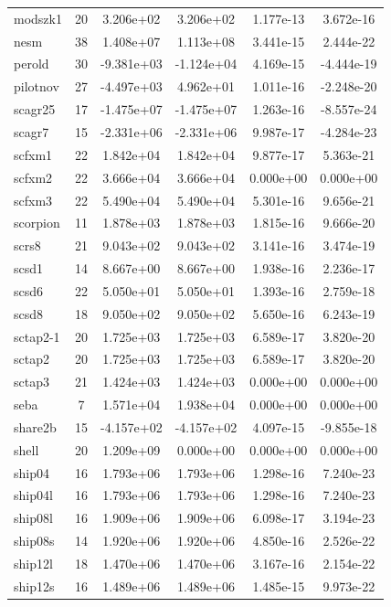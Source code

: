 \documentclass[12pt,a4paper]{article}
\begin{document}
\begin{longtable}{@{}l|ccccc@{}}
modszk1 & 20 & 3.206e+02 & 3.206e+02 & 1.177e-13 & 3.672e-16 \\
nesm & 38 & 1.408e+07 & 1.113e+08 & 3.441e-15 & 2.444e-22 \\
perold & 30 & -9.381e+03 & -1.124e+04 & 4.169e-15 & -4.444e-19 \\
pilotnov & 27 & -4.497e+03 & 4.962e+01 & 1.011e-16 & -2.248e-20 \\
scagr25 & 17 & -1.475e+07 & -1.475e+07 & 1.263e-16 & -8.557e-24 \\
scagr7 & 15 & -2.331e+06 & -2.331e+06 & 9.987e-17 & -4.284e-23 \\
scfxm1 & 22 & 1.842e+04 & 1.842e+04 & 9.877e-17 & 5.363e-21 \\
scfxm2 & 22 & 3.666e+04 & 3.666e+04 & 0.000e+00 & 0.000e+00 \\
scfxm3 & 22 & 5.490e+04 & 5.490e+04 & 5.301e-16 & 9.656e-21 \\
scorpion & 11 & 1.878e+03 & 1.878e+03 & 1.815e-16 & 9.666e-20 \\
scrs8 & 21 & 9.043e+02 & 9.043e+02 & 3.141e-16 & 3.474e-19 \\
scsd1 & 14 & 8.667e+00 & 8.667e+00 & 1.938e-16 & 2.236e-17 \\
scsd6 & 22 & 5.050e+01 & 5.050e+01 & 1.393e-16 & 2.759e-18 \\
scsd8 & 18 & 9.050e+02 & 9.050e+02 & 5.650e-16 & 6.243e-19 \\
sctap2-1 & 20 & 1.725e+03 & 1.725e+03 & 6.589e-17 & 3.820e-20 \\
sctap2 & 20 & 1.725e+03 & 1.725e+03 & 6.589e-17 & 3.820e-20 \\
sctap3 & 21 & 1.424e+03 & 1.424e+03 & 0.000e+00 & 0.000e+00 \\
seba & 7 & 1.571e+04 & 1.938e+04 & 0.000e+00 & 0.000e+00 \\
share2b & 15 & -4.157e+02 & -4.157e+02 & 4.097e-15 & -9.855e-18 \\
shell & 20 & 1.209e+09 & 0.000e+00 & 0.000e+00 & 0.000e+00 \\
ship04 & 16 & 1.793e+06 & 1.793e+06 & 1.298e-16 & 7.240e-23 \\
ship04l & 16 & 1.793e+06 & 1.793e+06 & 1.298e-16 & 7.240e-23 \\
ship08l & 16 & 1.909e+06 & 1.909e+06 & 6.098e-17 & 3.194e-23 \\
ship08s & 14 & 1.920e+06 & 1.920e+06 & 4.850e-16 & 2.526e-22 \\
ship12l & 18 & 1.470e+06 & 1.470e+06 & 3.167e-16 & 2.154e-22 \\
ship12s & 16 & 1.489e+06 & 1.489e+06 & 1.485e-15 & 9.973e-22 \\

\end{longtable}
\end{document}
